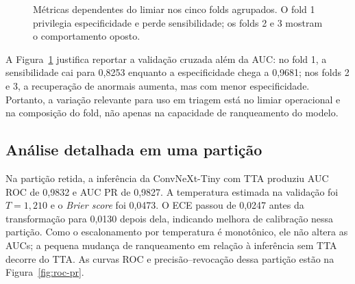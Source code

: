 \begin{figure}[ht]
\centering
{}
\caption{Métricas dependentes do limiar nos cinco folds agrupados. O fold 1
privilegia especificidade e perde sensibilidade; os folds 2 e 3 mostram o
comportamento oposto.}
\label{fig:cv-folds}
\end{figure}

A Figura~\ref{fig:cv-folds} justifica reportar a validação cruzada além da AUC:
no fold 1, a sensibilidade cai para 0,8253 enquanto a especificidade chega a
0,9681; nos folds 2 e 3, a recuperação de anormais aumenta, mas com menor
especificidade. Portanto, a variação relevante para uso em triagem está no
limiar operacional e na composição do fold, não apenas na capacidade de
ranqueamento do modelo.

\subsection{Análise detalhada em uma partição}

Na partição retida, a inferência da ConvNeXt-Tiny com TTA produziu AUC ROC de
0,9832 e AUC PR de 0,9827. A temperatura estimada na validação foi
$T=1{,}210$ e o \emph{Brier score} foi 0,0473. O ECE passou de 0,0247 antes da
transformação para 0,0130 depois dela, indicando melhora de calibração nessa
partição. Como o escalonamento por temperatura é monotônico, ele não altera as
AUCs; a pequena mudança de ranqueamento em relação à inferência sem TTA decorre
do TTA. As curvas ROC e precisão--revocação dessa partição estão na
Figura~\ref{fig:roc-pr}.

